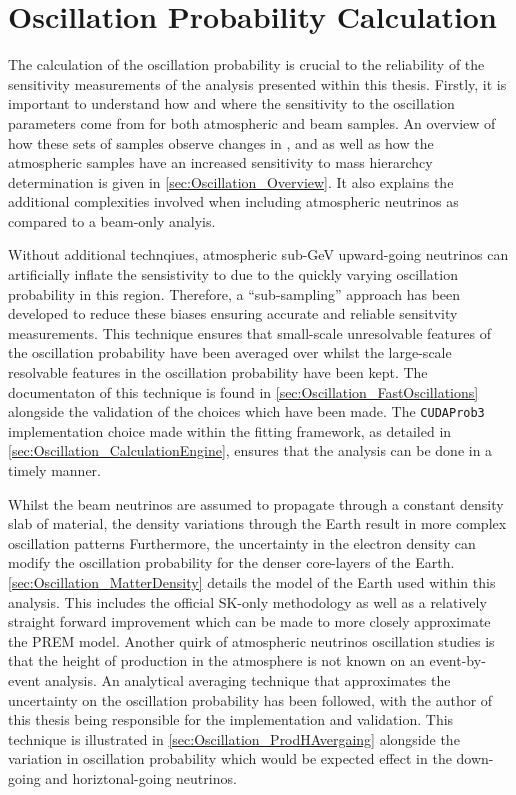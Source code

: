 \chapter{Oscillation Probability Calculation}
\label{chap:OscillationProbability}

The calculation of the oscillation probability is crucial to the reliability of the sensitivity measurements of the analysis presented within this thesis. Firstly, it is important to understand how and where the sensitivity to the oscillation parameters come from for both atmospheric and beam samples. An overview of how these sets of samples observe changes in \dcp, \delmsqatm and \sinsqatm as well as how the atmospheric samples have an increased sensitivity to mass hierarchcy determination is given in \autoref{sec:Oscillation_Overview}. It also explains the additional complexities involved when including atmospheric neutrinos as compared to a beam-only analyis.

Without additional technqiues, atmospheric sub-GeV upward-going neutrinos can artificially inflate the sensistivity to \dcp due to the quickly varying oscillation probability in this region. Therefore, a ``sub-sampling'' approach has been developed to reduce these biases ensuring accurate and reliable sensitvity measurements. This technique ensures that small-scale unresolvable features of the oscillation probability have been averaged over whilst the large-scale resolvable features in the oscillation probability have been kept. The documentaton of this technique is found in \autoref{sec:Oscillation_FastOscillations} alongside the validation of the choices which have been made. The \texttt{CUDAProb3} implementation choice made within the fitting framework, as detailed in \autoref{sec:Oscillation_CalculationEngine}, ensures that the analysis can be done in a timely manner.

Whilst the beam neutrinos are assumed to propagate through a constant density slab of material, the density variations through the Earth result in more complex oscillation patterns Furthermore, the uncertainty in the electron density can modify the oscillation probability for the denser core-layers of the Earth. \autoref{sec:Oscillation_MatterDensity} details the model of the Earth used within this analysis. This includes the official SK-only methodology as well as a relatively straight forward improvement which can be made to more closely approximate the PREM model. Another quirk of atmospheric neutrinos oscillation studies is that the height of production in the atmosphere is not known on an event-by-event analysis. An analytical averaging technique that approximates the uncertainty on the oscillation probability has been followed, with the author of this thesis being responsible for the implementation and validation. This technique is illustrated in \autoref{sec:Oscillation_ProdHAvergaing} alongside the variation in oscillation probability which would be expected effect in the down-going and horiztonal-going neutrinos.

